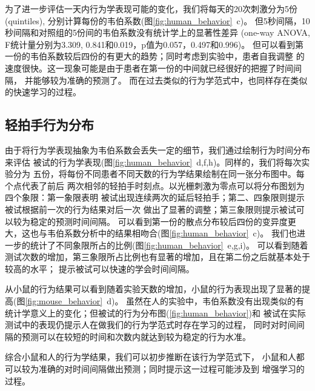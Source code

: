 为了进一步评估一天内行为学表现可能的变化，我们将每天的20次刺激分为5份(quintiles),
分别计算每份的韦伯系数(图\ref{fig:human_behavior}~c)。
但5秒间隔，10秒间隔和对照组的5份间的韦伯系数没有统计学上的显著性差异
(one-way ANOVA, F统计量分别为3.309, 0.841和0.019，p值为0.057，0.497和0.996)。
但可以看到第一份的韦伯系数较后四份的有更大的趋势；同时考虑到实验中，患者自我调整
的速度很快。这一现象可能是由于患者在第一份的中间就已经很好的把握了时间间隔，
并能够较为准确的预测了。
而在过去类似的行为学范式中，也同样存在类似的快速学习的过程\cite{simen2011model}。

\subsection{轻拍手行为分布}
由于将行为学表现抽象为韦伯系数会丢失一定的细节，我们通过绘制行为时间分布来评估
被试的行为学表现(图\ref{fig:human_behavior}~d,f,h)。同样的，我们将每次实验分为
五份，将每份不同患者不同天数的行为学结果绘制在同一张分布图中。每个点代表了前后
两次相邻的轻拍手时刻点。以光栅刺激为零点可以将分布图划为四个象限：第一象限表明
被试出现连续两次的延后轻拍手；第二、四象限则提示被试根据前一次的行为结果对后一次
做出了显著的调整；第三象限则提示被试可以较为稳定的预测时间间隔。
可以看到第一份的散点分布较后四份的变异度更大，这也与韦伯系数分析中的结果相吻合(图\ref{fig:human_behavior}~c)。
我们也进一步的统计了不同象限所占的比例(图\ref{fig:human_behavior}~e,g,i)。
可以看到随着测试次数的增加，第三象限所占比例也有显著的增加，且在第二份之后就基本处于较高的水平；
提示被试可以快速的学会时间间隔。

\bigskip
从小鼠的行为结果可以看到随着实验天数的增加，小鼠的行为表现出现了显著的提高(图\ref{fig:mouse_behavior}~d)。
虽然在人的实验中，韦伯系数没有出现类似的有统计学意义上的变化；但被试的行为分布图(\ref{fig:human_behavior})和
被试在实际测试中的表现仍提示人在做我们的行为学范式时存在学习的过程，
同时对时间间隔的预测可以在较短的时间和次数内就达到较为稳定的行为水准。

综合小鼠和人的行为学结果，我们可以初步推断在该行为学范式下，
小鼠和人都可以较为准确的对时间间隔做出预测；同时提示这一过程可能涉及到
增强学习的过程。

